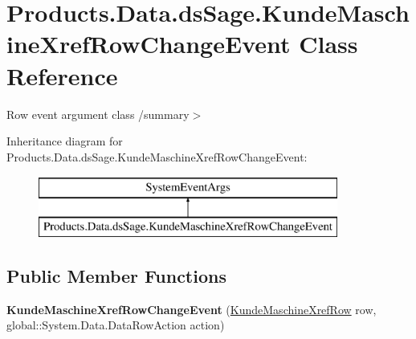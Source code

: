 \hypertarget{class_products_1_1_data_1_1ds_sage_1_1_kunde_maschine_xref_row_change_event}{}\section{Products.\+Data.\+ds\+Sage.\+Kunde\+Maschine\+Xref\+Row\+Change\+Event Class Reference}
\label{class_products_1_1_data_1_1ds_sage_1_1_kunde_maschine_xref_row_change_event}


Row event argument class /summary$>$  


Inheritance diagram for Products.\+Data.\+ds\+Sage.\+Kunde\+Maschine\+Xref\+Row\+Change\+Event\+:\begin{figure}[H]
\begin{center}
\leavevmode
\includegraphics[height=2.000000cm]{class_products_1_1_data_1_1ds_sage_1_1_kunde_maschine_xref_row_change_event}
\end{center}
\end{figure}
\subsection*{Public Member Functions}
\begin{DoxyCompactItemize}
\item 
{\bfseries Kunde\+Maschine\+Xref\+Row\+Change\+Event} (\hyperlink{class_products_1_1_data_1_1ds_sage_1_1_kunde_maschine_xref_row}{Kunde\+Maschine\+Xref\+Row} row, global\+::\+System.\+Data.\+Data\+Row\+Action action)\hypertarget{class_products_1_1_data_1_1ds_sage_1_1_kunde_maschine_xref_row_change_event_a8db35902d22d93e8f22245be0e8c9e60}{}\label{class_products_1_1_data_1_1ds_sage_1_1_kunde_maschine_xref_row_change_event_a8db35902d22d93e8f22245be0e8c9e60}

\end{DoxyCompactItemize}
